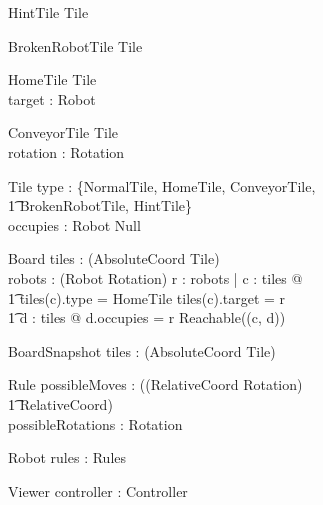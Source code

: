 \documentclass[12pt]{article}
\begin{document}
\begin{schema}{HintTile}
Tile
\end{schema}

\begin{schema}{BrokenRobotTile}
Tile
\end{schema}

\begin{schema}{HomeTile}
Tile \\
target : Robot
\end{schema}

\begin{schema}{ConveyorTile}
Tile \\
rotation : Rotation
\end{schema}

\begin{schema}{Tile}
type : \{NormalTile, HomeTile, ConveyorTile, \\ \t1 BrokenRobotTile, HintTile\} \\
occupies : Robot \cup Null
\end{schema}

\begin{schema}{Board}
tiles : \power (AbsoluteCoord \fun Tile) \\
robots : \power (Robot \fun Rotation)
\where
\forall r : robots | \exists c : \dom tiles @  \\ \t1 tiles(c).type = HomeTile \wedge tiles(c).target = r \wedge \\ \t1
\exists d : \dom tiles @ d.occupies = r \wedge Reachable((c, d))
\end{schema}

\begin{schema}{BoardSnapshot}
tiles : \power (AbsoluteCoord \fun Tile) \\
\end{schema}

\begin{schema}{Rule}
possibleMoves : \power ((RelativeCoord \times Rotation) \psurj \\ \t1 \seq RelativeCoord) \\
possibleRotations : \power Rotation
\end{schema}

\begin{schema}{Robot}
rules : Rules
\end{schema}

\begin{schema}{Viewer}
controller : Controller
\end{schema}
\end{document}
